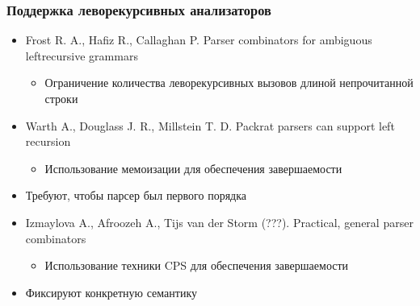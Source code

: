 \documentclass{beamer}
\begin{document}
\begin{frame}[fragile]
  \transwipe[direction=90]
  \frametitle{Поддержка леворекурсивных анализаторов}
  \begin{itemize}
    \item Frost R. A., Hafiz R., Callaghan P. Parser combinators for ambiguous leftrecursive grammars
    \begin{itemize}
      \item Ограничение количества леворекурсивных вызовов длиной непрочитанной строки
    \end{itemize}
    \item Warth A., Douglass J. R., Millstein T. D. Packrat parsers can support left recursion
    \begin{itemize}
      \item Использование мемоизации для обеспечения завершаемости
    \end{itemize}

    \item Требуют, чтобы парсер был первого порядка
  \end{itemize}

  \begin{itemize}
    \item Izmaylova	A., Afroozeh A., Tijs van der Storm (???). 
Practical, general parser combinators
    \begin{itemize}
      \item Использование техники CPS для обеспечения завершаемости
    \end{itemize}

    \item Фиксируют конкретную семантику
  \end{itemize}  

\end{frame}


\end{document}
